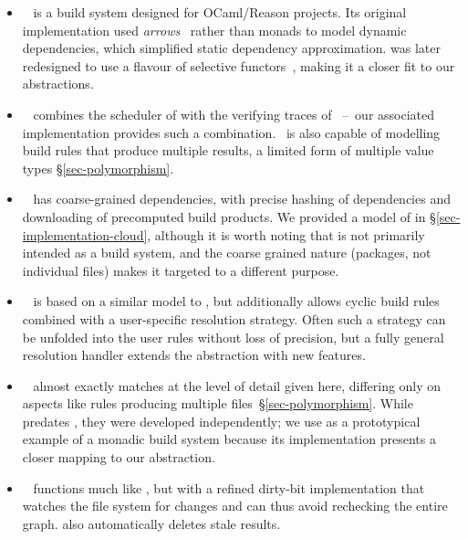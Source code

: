 \begin{itemize}
\item \Dune~\cite{dune} is a build system designed for OCaml/Reason projects.
Its original implementation used \emph{arrows}~\cite{hughes2000generalising}
rather than monads to model dynamic dependencies, which simplified static
dependency approximation. \Dune was later redesigned to use a flavour of
selective functors~\cite{mokhov_selective_2019}, making it a closer fit to our
abstractions.

\item \Ninja~\cite{ninja} combines the  scheduler of \Make with
the verifying traces of \Shake~--~our associated implementation provides such a
combination. \Ninja~is also capable of modelling build rules that produce
multiple results, a limited form of multiple value types \S\ref{sec-polymorphism}.

\item \Nix~\cite{dolstra2004nix} has coarse-grained dependencies, with precise
hashing of dependencies and downloading of precomputed build products. We
provided a model of \Nix in \S\ref{sec-implementation-cloud}, although it is
worth noting that \Nix is not primarily intended as a build system, and the
coarse grained nature (packages, not individual files) makes it targeted to a
different purpose.

\item \Pluto~\cite{erdweg2015pluto} is based on a similar model to \Shake, but
additionally allows cyclic build rules combined with a user-specific resolution
strategy. Often such a strategy can be unfolded into the user rules without loss
of precision, but a fully general resolution handler extends the 
abstraction with new features.

\item \Redo~\cite{redo-idea,grosskurth2007redo,redo} almost exactly
matches \Shake at the level of detail given here, differing only on aspects like
rules producing multiple files~\S\ref{sec-polymorphism}. While \Redo predates
\Shake, they were developed independently; we use \Shake as a prototypical
example of a monadic build system because its implementation presents a closer
mapping to our  abstraction.

\item \Tup~\cite{tup} functions much like \Make, but with a refined dirty-bit
implementation that watches the file system for changes and can thus avoid
rechecking the entire graph. \Tup also automatically deletes stale results.
\end{itemize}

